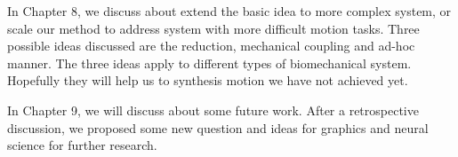 In Chapter 8, we discuss about extend the basic idea to more complex system, or scale our method to address system with more difficult motion tasks. Three possible ideas discussed are the reduction, mechanical coupling and ad-hoc manner. The three ideas apply to different types of biomechanical system.
Hopefully they will help us to synthesis motion we have not achieved yet.

In Chapter 9, we will discuss about some future work. After a retrospective discussion, we proposed some new question and ideas for graphics and neural science for further research.







